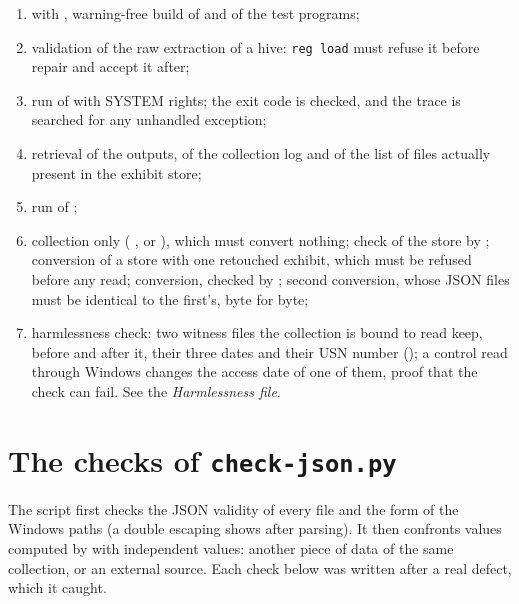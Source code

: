 \documentclass[11pt,a4paper,oneside]{report}
\begin{document}
\begin{enumerate}
  \item with , warning-free build of \wac{} and of the test
    programs;
  \item validation of the raw extraction of a hive: \texttt{reg load} must
    refuse it before repair and accept it after;
  \item run of \wac{} with SYSTEM rights; the exit code is checked, and the
    trace is searched for any unhandled exception;
  \item retrieval of the outputs, of the collection log and of the list of
    files actually present in the exhibit store;
  \item run of ;
  \item collection only (  , or
    ), which must convert nothing; check of the store by
    ; conversion of a store with one retouched
    exhibit, which must be refused before any read; conversion, checked by
    ; second conversion, whose JSON files must be
    identical to the first's, byte for byte;
  \item harmlessness check: two witness files the collection is bound to read
    keep, before and after it, their three dates and their USN number
    (); a control read through Windows changes the
    access date of one of them, proof that the check can fail. See the
    \emph{Harmlessness file}.
\end{enumerate}

\section{The checks of \texttt{check-json.py}}

The script first checks the JSON validity of every file and the form of the
Windows paths (a double escaping shows after parsing). It then confronts values
computed by \wac{} with independent values: another piece of data of the same
collection, or an external source. Each check below was written after a real
defect, which it caught.
\end{document}
